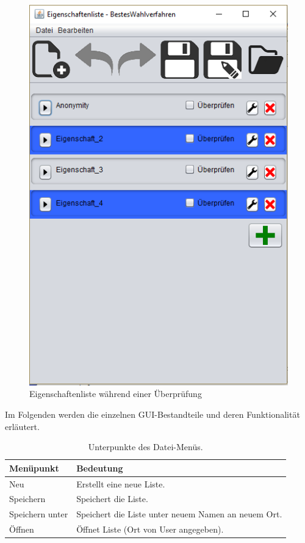 \documentclass[a4paper]{scrreprt}
\begin{document}
\begin{figure}[H]
\begin{minipage}{.5\textwidth}
  \includegraphics[scale=0.5]{Eigenschaften-Liste-waehrend-testen.png}
  \caption{Eigenschaftenliste während einer Überprüfung}
  \label{fig:sub2}
\end{minipage}
\end{figure}

Im Folgenden werden die einzelnen \ac{GUI}-Bestandteile und deren Funktionalität erläutert.

\begin{table}[H]
\begin{tabular}{|p{3cm}|p{12cm}|}
Menüpunkt & Bedeutung \\
\hline
Neu & Erstellt eine neue Liste.\\
\hline
Speichern & Speichert die Liste.\\
\hline
Speichern unter & Speichert die Liste unter neuem Namen an neuem Ort.\\
\hline
Öffnen & Öffnet Liste (Ort von User angegeben).
\end{tabular}
\label{Eigenschaftenliste-Datei-Menüpunkte}
\caption{Unterpunkte des Datei-Menüs.}
\end{table}
\end{document}
